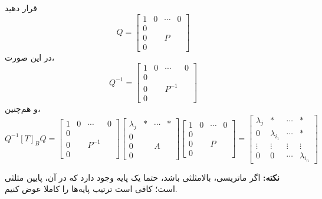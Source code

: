 قرار دهید
$$Q = \begin{bmatrix}
1 & 0 & \cdots & 0 \\
0 & \; & \; & \; \\
0 & \; & P & \; \\
0 & \; & \; & \;
\end{bmatrix}$$
در این صورت،
$$Q^{-1} = \begin{bmatrix}
1 & 0 & \cdots & 0 \\
0 & \; & \; & \; \\
0 & \; & P^{-1} & \; \\
0 & \; & \; & \;
\end{bmatrix}$$
و هم‌چنین،
$$Q^{-1}[T]_BQ =
\begin{bmatrix}
1 & 0 & \cdots & 0 \\
0 & \; & \; & \; \\
0 & \; & P^{-1} & \; \\
0 & \; & \; & \;
\end{bmatrix}
\begin{bmatrix}
\lambda_j & * & \cdots & * \\
0 & \; & \; & \; \\
0 & \; & A & \; \\
0 & \; & \; & \;
\end{bmatrix}
\begin{bmatrix}
1 & 0 & \cdots & 0 \\
0 & \; & \; & \; \\
0 & \; & P & \; \\
0 & \; & \; & \;
\end{bmatrix}
=
\begin{bmatrix}
\lambda_j & * & \cdots & * \\
0 & \lambda_{i_1} & \cdots & * \\
\vdots & \vdots & \vdots & \vdots \\
0 & 0 & \cdots & \lambda_{i_n}
\end{bmatrix}
$$

\textbf{نکته:}
اگر ماتریسی، بالامثلثی باشد، حتما یک پایه وجود دارد که در آن، پایین مثلثی است؛ کافی است ترتیب پایه‌ها را کاملا عوض کنیم.










